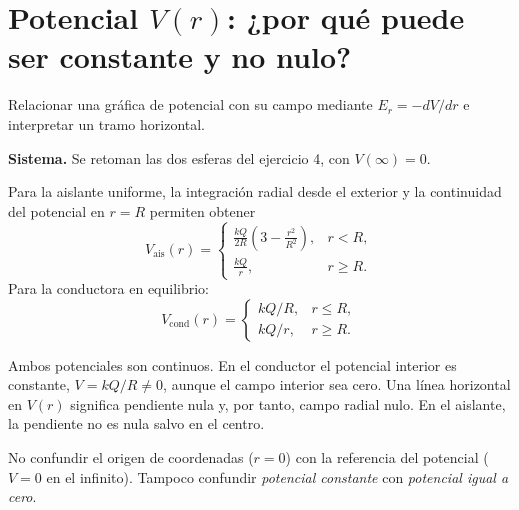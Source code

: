 \documentclass[11pt,a4paper]{article}
\newcommand{\ej}[2]{\clearpage\section{#2}}
\begin{document}
\ej{5}{Potencial $V(r)$: ¿por qué puede ser constante y no nulo?}
\begin{objetivo}Relacionar una gráfica de potencial con su campo mediante $E_r=-dV/dr$ e interpretar un tramo horizontal.\end{objetivo}
\textbf{Sistema.} Se retoman las dos esferas del ejercicio 4, con $V(\infty)=0$.
\begin{metodo}
Para la aislante uniforme, la integración radial desde el exterior y la continuidad del potencial en $r=R$ permiten obtener
\[\boxed{V_{\mathrm{ais}}(r)=\begin{cases}\displaystyle\frac{kQ}{2R}\left(3-\frac{r^2}{R^2}\right),&r<R,\\[2mm]\displaystyle\frac{kQ}{r},&r\ge R.\end{cases}}\]
Para la conductora en equilibrio:
\[\boxed{V_{\mathrm{cond}}(r)=\begin{cases}kQ/R,&r\le R,\\ kQ/r,&r\ge R.\end{cases}}\]
\end{metodo}
\begin{center}\end{center}
\begin{resultado}Ambos potenciales son continuos. En el conductor el potencial interior es constante, $V=kQ/R\ne0$, aunque el campo interior sea cero. Una línea horizontal en $V(r)$ significa pendiente nula y, por tanto, campo radial nulo. En el aislante, la pendiente no es nula salvo en el centro.\end{resultado}
\begin{alerta}No confundir el origen de coordenadas ($r=0$) con la referencia del potencial ($V=0$ en el infinito). Tampoco confundir \emph{potencial constante} con \emph{potencial igual a cero}.\end{alerta}
\end{document}
